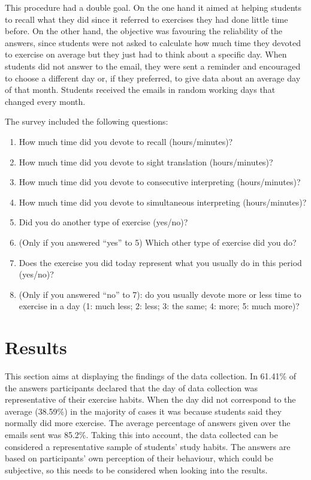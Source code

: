 \documentclass[output=paper]{../langscibook}
\begin{document}
This procedure had a double goal. On the one hand it aimed at helping students to recall what they did since it referred to exercises they had done little time before. On the other hand, the objective was favouring the reliability of the answers, since students were not asked to calculate how much time they devoted to exercise on average but they just had to think about a specific day. When students did not answer to the email, they were sent a reminder and encouraged to choose a different day or, if they preferred, to give data about an average day of that month. Students received the emails in random working days that changed every month.

The survey included the following questions:

\begin{enumerate}[noitemsep]
\item How much time did you devote to recall (hours/minutes)?
\item How much time did you devote to sight translation (hours/minutes)?
\item How much time did you devote to consecutive interpreting (hours/minutes)?
\item How much time did you devote to simultaneous interpreting (hours/minutes)?
\item Did you do another type of exercise (yes/no)?
\item (Only if you answered ``yes'' to 5) Which other type of exercise did you do?
\item Does the exercise you did today represent what you usually do in this period (yes/no)?
\item (Only if you answered ``no'' to 7): do you usually devote more or less time to exercise in a day (1: much less; 2: less; 3: the same; 4: more; 5: much more)?
\end{enumerate}



\section{Results}


This section aims at displaying the findings of the data collection. In 61.41\% of the answers participants declared that the day of data collection was representative of their exercise habits. When the day did not correspond to the average (38.59\%) in the majority of cases it was because students said they normally did more exercise. The average percentage of answers given over the emails sent was 85.2\%. Taking this into account, the data collected can be considered a representative sample of students’ study habits. The answers are based on participants’ own perception of their behaviour, which could be subjective, so this needs to be considered when looking into the results.
\end{document}
